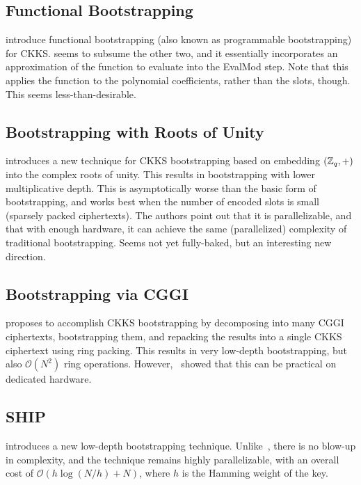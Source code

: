 \documentclass[../fheimpl.tex]{subfiles}
\begin{document}
    \subsection{Functional Bootstrapping}
    \cite{cryptoeprint:2024/1623, cryptoeprint:2024/1637, cryptoeprint:2024/1638} introduce functional bootstrapping (also known as programmable bootstrapping) for CKKS. \cite{cryptoeprint:2024/1623} seems to subsume the other two, and it essentially incorporates an approximation of the function to evaluate into the \textsf{EvalMod} step. Note that this applies the function to the polynomial coefficients, rather than the slots, though. This seems less-than-desirable. 

    \subsection{Bootstrapping with Roots of Unity}
    \cite{cryptoeprint:2025/651} introduces a new technique for CKKS bootstrapping based on embedding $(\mathbb{Z}_q,+)$ into the complex roots of unity. This results in bootstrapping with lower multiplicative depth. This is asymptotically worse than the basic form of bootstrapping, and works best when the number of encoded slots is small (sparsely packed ciphertexts). The authors point out that it is parallelizable, and that with enough hardware, it can achieve the same (parallelized) complexity of traditional bootstrapping. Seems not yet fully-baked, but an interesting new direction.

    \subsection{Bootstrapping via CGGI}
    \cite{cryptoeprint:2021/691} proposes to accomplish CKKS bootstrapping by decomposing into many CGGI ciphertexts, bootstrapping them, and repacking the results into a single CKKS ciphertext using ring packing. This results in very low-depth bootstrapping, but also $\mathcal{O}(N^2)$ ring operations. However,~\cite{10609598} showed that this can be practical on dedicated hardware.

    \subsection{SHIP}
    \cite{cryptoeprint:2025/784} introduces a new low-depth bootstrapping technique. Unlike~\cite{cryptoeprint:2021/691}, there is no blow-up in complexity, and the technique remains highly parallelizable, with an overall cost of $\mathcal{O}(h\log(N/h)+N)$, where $h$ is the Hamming weight of the key.
\end{document}
